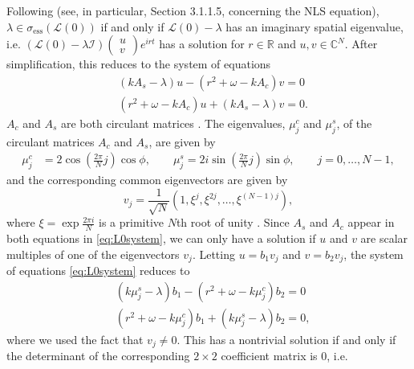 \documentclass[11pt,reqno]{amsart}
\def\R{{\mathbb R}}
\def\C{{\mathbb C}}
\def\calI{{\mathcal I}}
\def\calL{{\mathcal L}}
\begin{document}
Following \cite[Section 3.1]{Kapitula2013} (see, in particular, Section 3.1.1.5, concerning the NLS equation), $\lambda \in \sigma_{\text{ess}}(\calL(0))$ if and only if $\calL(0) - \lambda$ has an imaginary spatial eigenvalue, i.e. 
$\left(\calL(0)-\lambda \calI \right) \begin{pmatrix}u\\v\end{pmatrix} e^{i r t}$
has a solution for $r \in \R$ and $u, v \in \C^N$. After simplification, this reduces to the system of equations 
\begin{equation}\label{eq:L0system}
\begin{aligned}
&(k A_s - \lambda)u - (r^2 + \omega - k A_c) v = 0 \\
&(r^2 + \omega - k A_c)u + (k A_s - \lambda) v = 0.
\end{aligned}
\end{equation}
$A_c$ and $A_s$ are both circulant matrices \cite{davis2012circulant}. The eigenvalues, $\mu_j^c$ and $\mu_j^s$, of the circulant matrices $A_c$ and $A_s$, are given by
\begin{equation}\label{eq:circeigs}
\begin{aligned}
\mu_j^c &= 2 \cos\left( \frac{2 \pi}{N} j\right) \cos \phi, \qquad 
\mu_j^s = 2 i \sin\left( \frac{2 \pi}{N} j\right) \sin \phi, \qquad
j = 0, \dots, N-1,
\end{aligned}
\end{equation}
and the corresponding common eigenvectors are given by
\begin{equation}\label{eq:circevecs}
v_j = \frac{1}{\sqrt{N}}\left(1, \xi^j, \xi^{2j}, \dots, \xi^{(N-1)j} \right),
\end{equation}
where $\xi = \exp{\frac{2\pi i}{N}}$ is a primitive $N$th root of unity \cite{davis2012circulant}. Since $A_s$ and $A_c$ appear in both equations in \cref{eq:L0system}, we can only have a solution if $u$ and $v$ are scalar multiples of one of the eigenvectors $v_j$. Letting $u = b_1 v_j$ and $v = b_2 v_j$, the system of equations \cref{eq:L0system} reduces to 
\begin{equation}\label{eq:L0system2}
\begin{aligned}
&(k \mu_j^s - \lambda) b_1 - (r^2 + \omega - k \mu_j^c) b_2 = 0 \\
&(r^2 + \omega - k \mu_j^c) b_1 + (k \mu_j^s - \lambda) b_2 = 0,
\end{aligned}
\end{equation}
where we used the fact that $v_j \neq 0$. This has a nontrivial solution if and only if the determinant of the corresponding $2 \times 2$ coefficient matrix is 0, i.e.
\end{document}
